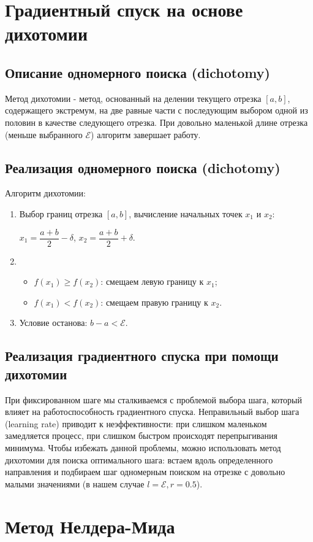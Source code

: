\documentclass{article}
\begin{document}
\section*{Градиентный спуск на основе дихотомии}
\subsection*{Описание одномерного поиска (dichotomy)}
Метод дихотомии - метод, основанный на делении текущего отрезка $[a, b]$, содержащего экстремум, на две равные части с последующим выбором одной из половин в качестве следующего отрезка.
При довольно маленькой длине отрезка (меньше выбранного $\mathcal{E}$) алгоритм завершает работу.
\subsection*{Реализация одномерного поиска (dichotomy)}
Алгоритм дихотомии:
\begin{enumerate}
    \item Выбор границ отрезка $[a, b]$, вычисление начальных точек $x_1$ и $x_2$:

    $x_1 = \dfrac{a + b}{2} - \delta$, \; $x_2 = \dfrac{a + b}{2} + \delta$.
    \item \begin{itemize}
        \item $f(x_1) \geq f(x_2)$: смещаем левую границу к $x_1$;
        \item $f(x_1) < f(x_2)$: смещаем правую границу к $x_2$.
    \end{itemize}
    \item Условие останова: $b - a < \mathcal{E}$.
\end{enumerate}
\subsection*{Реализация градиентного спуска при помощи дихотомии}
При фиксированном шаге мы сталкиваемся с проблемой выбора шага, который влияет на работоспособность градиентного спуска. Неправильный выбор шага (learning rate) приводит к неэффективности: при слишком маленьком замедляется процесс, при слишком быстром происходят перепрыгивания минимума. Чтобы избежать данной проблемы, можно использовать метод дихотомии для поиска оптимального шага: встаем вдоль определенного направления и подбираем шаг одномерным поиском на отрезке с довольно малыми значениями (в нашем случае $l = \mathcal{E}, r = 0.5$).

\newpage
\section*{Метод Нелдера-Мида}
\end{document}
